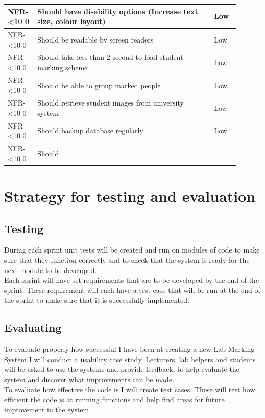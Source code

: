 \documentclass[12pt]{article}  %
\newcommand{\rid}[1]{\centering #1-\ifnum\value{requirement}<10 0\fi\arabic{requirement} \stepcounter{requirement}}
\begin{document}
\begin{spacing}{1.5}
\begin{longtable}{|p{0.1\linewidth}|p{0.7\linewidth}|p{0.1\linewidth}|}
\rid{NFR} & Should have disability options (Increase text size, colour layout) & Low\\ \hline
\rid{NFR} & Should be readable by screen readers & Low\\ \hline
\rid{NFR} & Should take less than 2 second to load student marking scheme & Low\\ \hline
\rid{NFR} & Should be able to group marked people & Low \\ \hline
\rid{NFR} & Should retrieve student images from university system & Low\\ \hline
\rid{NFR} & Should backup database regularly & Low\\ \hline


\rid{NFR} & Should  &  \\ \hline
\end{longtable}
\end{spacing}


\setcounter{requirement}{1}




\newpage


\section{Strategy for testing and evaluation}


\subsection{Testing}
During each sprint unit tests will be created and run on modules of code to make sure that they function correctly and to check that the system is ready for the next module to be developed.\\
Each sprint will have set requirements that are to be developed by the end of the sprint. These requirement will each have a test case that will be run at the end of the sprint to make sure that it is successfully implemented.


\subsection{Evaluating}
To evaluate properly how successful I have been at creating a new Lab Marking System I will conduct a usability case study. Lecturers, lab helpers and students will be asked to use the systems and provide feedback, to help evaluate the system and discover what improvements can be made.\\
To evaluate how effective the code is I will create test cases. These will test how efficient the code is at running functions and help find areas for future improvement in the system.
\end{document}
